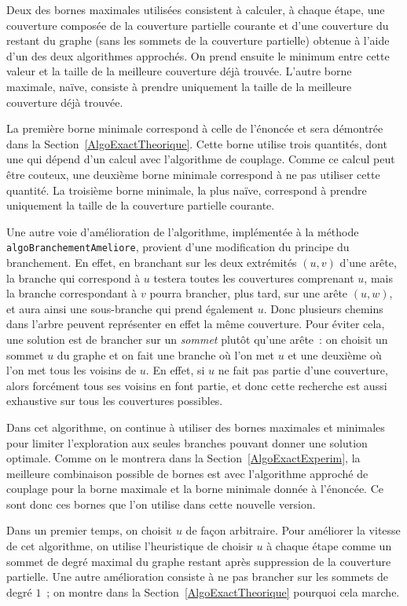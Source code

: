 \documentclass[a4paper,11pt]{amsart}
\theoremstyle{plain}
\begin{document}
Deux des bornes maximales utilisées consistent à calculer, à chaque étape, une couverture composée de la couverture partielle courante et d'une couverture du restant du graphe (sans les sommets de la couverture partielle) obtenue à l'aide d'un des deux algorithmes approchés. On prend ensuite le minimum entre cette valeur et la taille de la meilleure couverture déjà trouvée. L'autre borne maximale, naïve, consiste à prendre uniquement la taille de la meilleure couverture déjà trouvée.

La première borne minimale correspond à celle de l'énoncée et sera démontrée dans la Section~\ref{AlgoExactTheorique}. Cette borne utilise trois quantités, dont une qui dépend d'un calcul avec l'algorithme de couplage. Comme ce calcul peut être couteux, une deuxième borne minimale correspond à ne pas utiliser cette quantité. La troisième borne minimale, la plus naïve, correspond à prendre uniquement la taille de la couverture partielle courante.

Une autre voie d'amélioration de l'algorithme, implémentée à la méthode \texttt{algoBranchementAmeliore}, provient d'une modification du principe du branchement. En effet, en branchant sur les deux extrémités $(u, v)$ d'une arête, la branche qui correspond à $u$ testera toutes les couvertures comprenant $u$, mais la branche correspondant à $v$ pourra brancher, plus tard, sur une arête $(u, w)$, et aura ainsi une sous-branche qui prend également $u$. Donc plusieurs chemins dans l'arbre peuvent représenter en effet la même couverture. Pour éviter cela, une solution est de brancher sur un \emph{sommet} plutôt qu'une arête~: on choisit un sommet $u$ du graphe et on fait une branche où l'on met $u$ et une deuxième où l'on met tous les voisins de $u$. En effet, si $u$ ne fait pas partie d'une couverture, alors forcément tous ses voisins en font partie, et donc cette recherche est aussi exhaustive sur tous les couvertures possibles.

Dans cet algorithme, on continue à utiliser des bornes maximales et minimales pour limiter l'exploration aux seules branches pouvant donner une solution optimale. Comme on le montrera dans la Section~\ref{AlgoExactExperim}, la meilleure combinaison possible de bornes est avec l'algorithme approché de couplage pour la borne maximale et la borne minimale donnée à l'énoncée. Ce sont donc ces bornes que l'on utilise dans cette nouvelle version.

Dans un premier temps, on choisit $u$ de façon arbitraire. Pour améliorer la vitesse de cet algorithme, on utilise l'heuristique de choisir $u$ à chaque étape comme un sommet de degré maximal du graphe restant après suppression de la couverture partielle. Une autre amélioration consiste à ne pas brancher sur les sommets de degré $1$~; on montre dans la Section~\ref{AlgoExactTheorique} pourquoi cela marche.
\end{document}
